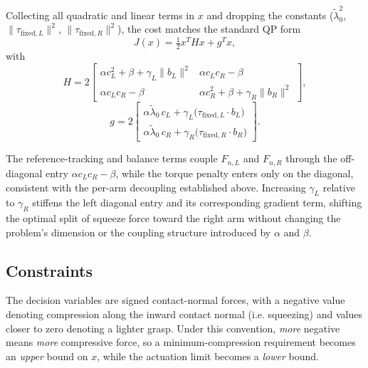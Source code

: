 \documentclass[conference]{IEEEtran}
\begin{document}
Collecting all quadratic and linear terms in $x$ and dropping the constants ($\tilde\lambda_0^2$, $\lVert\tau_{\mathrm{fixed},L}\rVert^2$, $\lVert\tau_{\mathrm{fixed},R}\rVert^2$), the cost matches the standard QP form
\begin{equation}
J(x) = \tfrac{1}{2}x^{T}Hx + g^{T}x,
\end{equation}
with
\begin{equation}
H = 2
\begin{bmatrix}
\alpha c_L^{2}+\beta+\gamma_L\lVert b_L\rVert^2 &
\alpha c_Lc_R-\beta \\[4pt]
\alpha c_Lc_R-\beta &
\alpha c_R^{2}+\beta+\gamma_R\lVert b_R\rVert^2
\end{bmatrix},
\label{eq:H_full}
\end{equation}
\begin{equation}
g =
2\begin{bmatrix}
\alpha\tilde\lambda_0\,c_L + \gamma_L\big(\tau_{\mathrm{fixed},L}\cdot b_L\big) \\[4pt]
\alpha\tilde\lambda_0\,c_R + \gamma_R\big(\tau_{\mathrm{fixed},R}\cdot b_R\big)
\end{bmatrix}.
\label{eq:g_full}
\end{equation}

The reference-tracking and balance terms couple $F_{n,L}$ and $F_{n,R}$ through the off-diagonal entry $\alpha c_Lc_R-\beta$, while the torque penalty enters only on the diagonal, consistent with the per-arm decoupling established above. Increasing $\gamma_L$ relative to $\gamma_R$ stiffens the left diagonal entry and its corresponding gradient term, shifting the optimal split of squeeze force toward the right arm without changing the problem's dimension or the coupling structure introduced by $\alpha$ and $\beta$.
\subsection{Constraints}
\label{sec:constraints}

The decision variables are signed contact-normal forces, with a negative value denoting compression along the inward contact normal (i.e. squeezing) and values closer to zero denoting a lighter grasp. Under this convention, \emph{more} negative means \emph{more} compressive force, so a minimum-compression requirement becomes an \emph{upper} bound on $x$, while the actuation limit becomes a \emph{lower} bound.
\end{document}
